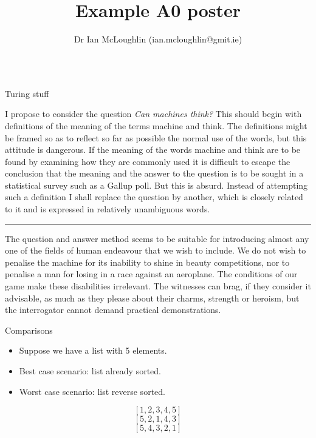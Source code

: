 \documentclass[dvipsnames, final]{beamer}
\title{Example A0 poster}
\subtitle{}
\author{Dr Ian McLoughlin (ian.mcloughlin@gmit.ie)}
\institute{Department and University Name}
\date{}
\newcommand{\hr}{\rule{\textwidth}{0.5pt}\newline}
\newlength{\colwidth}
\begin{document}
\begin{frame}[t,fragile]

\begin{columns}[t]

\begin{column}{\colwidth}


\begin{block}{Turing stuff}
  
  \justifying
  I propose to consider the question \emph{Can machines think?}
  This should begin with definitions of the meaning of the terms machine and think.
  The definitions might be framed so as to reflect so far as possible the normal use of the words, but this attitude is dangerous.
  If the meaning of the words machine and think are to be found by examining how they are commonly used it is difficult to escape the conclusion that the meaning and the answer to the question is to be sought in a statistical survey such as a Gallup poll.
  But this is absurd.
  Instead of attempting such a definition I shall replace the question by another, which is closely related to it and is expressed in relatively unambiguous words.
  \hr
  The question and answer method seems to be suitable for introducing almost any one of the fields of human endeavour that we wish to include.
  We do not wish to penalise the machine for its inability to shine in beauty competitions, nor to penalise a man for losing in a race against an aeroplane.
  The conditions of our game make these disabilities irrelevant.
  The witnesses can brag, if they consider it advisable, as much as they please about their charms, strength or heroism, but the interrogator cannot demand practical demonstrations.
\end{block}


\begin{block}{Comparisons}
  \begin{itemize}
    \item Suppose we have a list with 5 elements.
    \item Best case scenario: list already sorted.
    \item Worst case scenario: list reverse sorted.
  \end{itemize}
  \[ [1,2,3,4,5] \]
  \[ [5,2,1,4,3] \]
  \[ [5,4,3,2,1] \]
\end{block}



\end{column}
\end{columns}
\end{frame}
\end{document}
